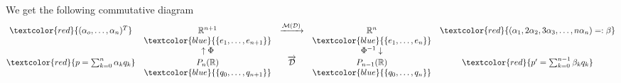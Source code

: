 {\begin{enumerate}
	\\
	We get the following commutative diagram
	$$
	\begin{matrix}
	\textcolor{red}{(\alpha_o,\dots,\alpha_n)^T}&\mathbb{R}^{n+1}&\xrightarrow{\mathcal{M}(\mathcal{D})}&\mathbb{R}^{n}&\textcolor{red}{(\alpha_1,2\alpha_2,3\alpha_3,\dots,n\alpha_n)=:\beta}\\
	&\textcolor{blue}{\{e_1,\dots,e_{n+1}\}}& &\textcolor{blue}{\{e_1,\dots,e_{n}\}}& \\
	&\uparrow \Phi& &\Phi^{-1}\downarrow& \\
	\textcolor{red}{p=\sum_{k=0}^{n}\alpha_kq_k}&P_n(\mathbb{R})&\overrightarrow{\mathcal{D}}&P_{n-1}(\mathbb{R})&\textcolor{red}{p'=\sum_{k=0}^{n-1}\beta_kq_k}\\
	&\textcolor{blue}{\{q_0,\dots,q_{n+1}\}}& &\textcolor{blue}{\{q_0,\dots,q_{n}\}}& 
	\end{matrix}
	$$
\end{enumerate}
}